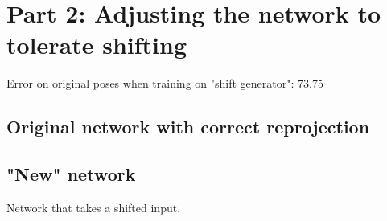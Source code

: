 \section{Part 2: Adjusting the network to tolerate shifting}
\label{sec:network-adjusting}

Error on original poses when training on "shift generator": 73.75
\subsection{Original network with correct reprojection}

\subsection{"New" network}
Network that takes a shifted input.